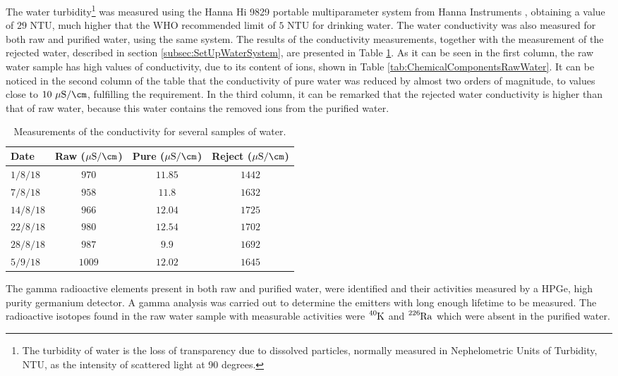 The water turbidity\footnote{The turbidity of water is the loss of transparency due to dissolved particles, normally measured in Nephelometric Units of Turbidity, NTU, as the intensity of scattered light at 90 degrees.} was measured using the Hanna Hi 9829 portable multiparameter system from Hanna Instruments \cite{TurbiditySystem}, obtaining a value of $29$ NTU, much higher that the WHO recommended limit of $5$ NTU for drinking water. The water conductivity was also measured for both raw and purified water, using the same system. The results of the conductivity measurements, together with the measurement of the rejected water, described in section \ref{subsec:SetUpWaterSystem}, are presented in Table \ref{tab:ConductivityValues}. As it can be seen in the first column, the raw water sample has high values of conductivity, due to its content of ions, shown in Table \ref{tab:ChemicalComponentsRawWater}. It can be noticed in the second column of the table that the conductivity of pure water was reduced by almost two orders of magnitude, to values close to $10~\mu\text{S}/\cm$, fulfilling the requirement. In the third column, it can be remarked that the rejected water conductivity is higher than that of raw water, because this water contains the removed ions from the purified water.


\begin{table}[htbp]
\centering{}%
\begin{tabular}{lccc}
\toprule 
Date & Raw ($\mu\text{S}/\cm$) & Pure ($\mu\text{S}/\cm$) & Reject ($\mu\text{S}/\cm$) \tabularnewline
\midrule
\midrule 
$1/8/18$ & $970$ & $11.85$ & $1442$ \tabularnewline
$7/8/18$ & $958$ & $11.8$ & $1632$ \tabularnewline
$14/8/18$ & $966$ & $12.04$ & $1725$ \tabularnewline
$22/8/18$ & $980$ & $12.54$ & $1702$ \tabularnewline
$28/8/18$ & $987$ & $9.9$ & $1692$ \tabularnewline
$5/9/18$ & $1009$ & $12.02$ & $1645$ \tabularnewline
\bottomrule
\end{tabular}
\caption{Measurements of the conductivity for several samples of water.}
\label{tab:ConductivityValues}
\end{table}

The gamma radioactive elements present in both raw and purified water, were identified and their activities measured by a HPGe, high purity germanium detector. A gamma analysis was carried out to determine the emitters with long enough lifetime to be measured. The radioactive isotopes found in the raw water sample with measurable activities were $\ce{^{40}K}$ and $\ce{^{226}Ra}$ which were absent in the purified water.

